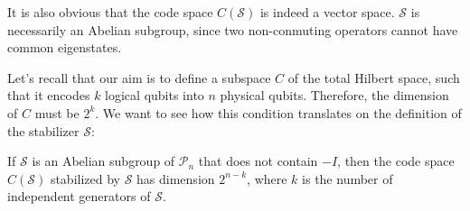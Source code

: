 \documentclass[12pt, twoside, openany]{book}
\begin{document}
It is also obvious that the code space $C(\mathcal{S})$ is indeed a vector space. $\mathcal{S}$ is necessarily an Abelian subgroup, since two non-conmuting operators cannot have common eigenstates. 

Let's recall that our aim is to define a subspace $C$ of the total Hilbert space, such that it encodes $k$ logical qubits into $n$ physical qubits. Therefore, the dimension of $C$ must be $2^k$. We want to see how this condition translates on the definition of the stabilizer $\mathcal{S}$:

\begin{proposition}
If $\mathcal{S}$ is an Abelian subgroup of $\mathcal{P}_n$ that does not contain $-I$, then the code space $C(\mathcal{S})$ stabilized by $\mathcal{S}$ has dimension $2^{n - k}$, where $k$ is the number of independent generators of $\mathcal{S}$.
\end{proposition}
\end{document}
